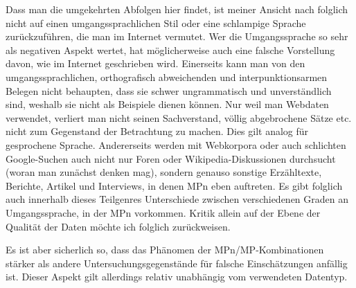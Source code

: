 Dass man die umgekehrten Abfolgen hier findet, ist meiner Ansicht nach folg\-lich nicht auf einen umgangssprachlichen Stil oder eine schlampige Sprache zurückzuführen, die man im Internet vermutet. Wer die Umgangssprache so sehr als negativen Aspekt wertet, hat möglicherweise auch eine falsche Vorstellung davon, wie im Internet geschrieben wird. Einerseits kann man von den umgangssprachli\-chen, orthografisch abweichenden und interpunktionsarmen Belegen nicht behaupten, dass sie schwer ungrammatisch und unverständlich sind, weshalb sie nicht als Beispiele dienen können. Nur weil man Webdaten verwendet, verliert man nicht seinen Sachverstand, völlig abgebrochene Sätze etc. nicht zum Gegenstand der Betrachtung zu machen. Dies gilt analog für gesprochene Sprache. Andererseits werden mit Webkorpora oder auch schlichten Google-Suchen auch nicht nur Foren oder Wikipedia-Diskussionen durchsucht (woran man zunächst denken mag), sondern genauso sonstige Erzähltexte, Berichte, Artikel und Interviews, in denen MPn eben auftreten. Es gibt folglich auch innerhalb dieses Teilgenres Unterschiede zwischen verschiedenen Graden an  Umgangssprache, in der MPn vorkommen. Kritik allein auf der Ebene der Qualität der Daten möchte ich folglich zurückweisen. 

Es ist aber sicherlich so, dass das Phänomen der MPn/MP-Kombinationen stärker als andere Untersuchungsgegenstände für falsche Einschätzungen anfällig ist. Dieser Aspekt gilt allerdings relativ unabhängig vom verwendeten Datentyp.

